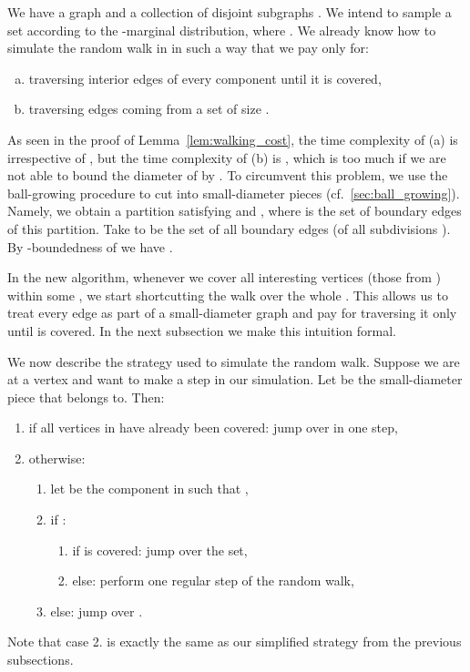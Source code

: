 \documentclass[11pt, letterpaper]{article}
\begin{document}
We have a graph  and a collection of disjoint subgraphs . We intend to sample a set according to the -marginal distribution, where . 
We already know how to simulate the random walk in  in such a way that we pay only for:
\begin{enumerate}[(a)]
\item traversing interior edges of every component  until it is covered,
\item traversing edges coming from a set  of size .
\end{enumerate}
As seen in the proof of Lemma~\ref{lem:walking_cost}, the time complexity of (a) is  irrespective of , but the time complexity of (b) is , which is too much if we are not able to bound the diameter of  by . To circumvent this problem, we use the ball-growing procedure to cut  into small-diameter pieces (cf.~\ref{sec:ball_growing}). Namely, we obtain a partition  satisfying  and , where  is the set of boundary edges of this partition. Take  to be the set of all boundary edges (of all subdivisions ). By -boundedness of  we have .

In the new algorithm, whenever we cover all interesting vertices (those from ) within some , we start shortcutting the walk over the whole . This allows us to treat every edge  as part of a small-diameter graph  and pay for traversing it only until  is covered. In the next subsection we make this intuition formal.

We now describe the strategy used to simulate the random walk. Suppose we are at a vertex  and want to make a step in our simulation. Let  be the small-diameter piece that  belongs to. Then:
\begin{enumerate}
	\item if all vertices in  have already been covered: jump over  in one step,
	\item otherwise:
	\begin{enumerate}
		\item let  be the component in  such that ,
		\item if :
		\begin{enumerate}
			\item if  is covered: jump over the  set,
			\item else: perform one regular step of the random walk,
		\end{enumerate}
		\item else: jump over .
	\end{enumerate}
\end{enumerate}
Note that case 2. is exactly the same as our simplified strategy from the previous subsections.
\end{document}
